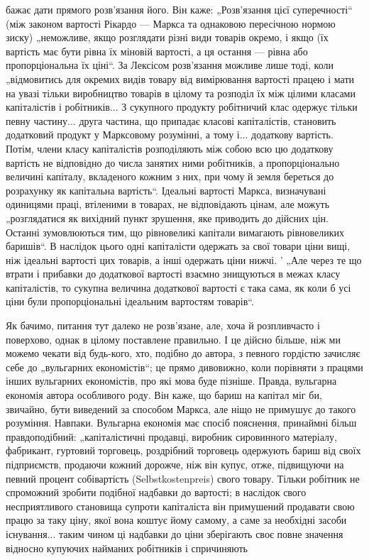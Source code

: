 \parcont{}  %
бажає дати прямого розв’язання його. Він каже: „Розв’язання
цієї суперечності“ (між законом вартості Рікардо — Маркса та однаковою
пересічною нормою зиску) „неможливе, якщо розглядати
різні види товарів окремо, і якщо (їх вартість має бути
рівна їх міновій вартості, а ця остання — рівна або пропорціональна
їх ціні“. За Лексісом розв’язання можливе лише тоді,
коли „відмовитись для окремих видів товару від вимірювання
вартості працею і мати на увазі тільки виробництво товарів
в цілому та розподіл їх між цілими класами капіталістів і робітників...
З сукупного продукту робітничий клас одержує тільки
певну частину... друга частина, що припадає класові капіталістів,
становить додатковий продукт у Марксовому розумінні, а тому і...
додаткову вартість. Потім, члени класу капіталістів розподіляють
між собою всю цю додаткову вартість не відповідно до числа
занятих ними робітників, а пропорціонально величині капіталу,
вкладеного кожним з них, при чому й земля береться до розрахунку
як капітальна вартість“. Ідеальні вартості Маркса, визначувані
одиницями праці, втіленими в товарах, не відповідають
цінам, але можуть „розглядатися як вихідний пункт зрушення,
яке приводить до дійсних цін. Останні зумовлюються тим, що
рівновеликі капітали вимагають рівновеликих баришів“. В наслідок
цього одні капіталісти одержать за свої товари ціни вищі,
ніж ідеальні вартості цих товарів, а інші одержать ціни нижчі. '
„Але через те що втрати і прибавки до додаткової вартості
взаємно знищуються в межах класу капіталістів, то сукупна
величина додаткової вартості є така сама, як коли б усі ціни
були пропорціональні ідеальним вартостям товарів“.

Як бачимо, питання тут далеко не розв’язане, але, хоча й
розпливчасто і поверхово, однак в цілому поставлене правильно.
І це дійсно більше, ніж ми можемо чекати від будь-кого,
хто, подібно до автора, з певного гордістю зачисляє себе
до „вульгарних економістів“; це прямо дивовижно, коли порівняти
з працями інших вульгарних економістів, про які мова буде
пізніше. Правда, вульгарна економія автора особливого роду.
Він каже, що бариш на капітал міг би, звичайно, бути виведений
за способом Маркса, але ніщо не примушує до такого розуміння.
Навпаки. Вульгарна економія має спосіб пояснення, принаймні
більш правдоподібний: „капіталістичні продавці, виробник
сировинного матеріалу, фабрикант, гуртовий торговець,
роздрібний торговець одержують бариш від своїх підприємств,
продаючи кожний дорожче, ніж він купує, отже, підвищуючи
на певний процент собівартість (Selbstkostenpreis) свого товару.
Тільки робітник не спроможний зробити подібної надбавки до
вартості; в наслідок свого несприятливого становища супроти
капіталіста він примушений продавати свою працю за таку ціну,
якої вона коштує йому самому, а саме за необхідні засоби існування...
таким чином ці надбавки до ціни зберігають своє повне
значення відносно купуючих найманих робітників і спричиняють
\parbreak{}  %
